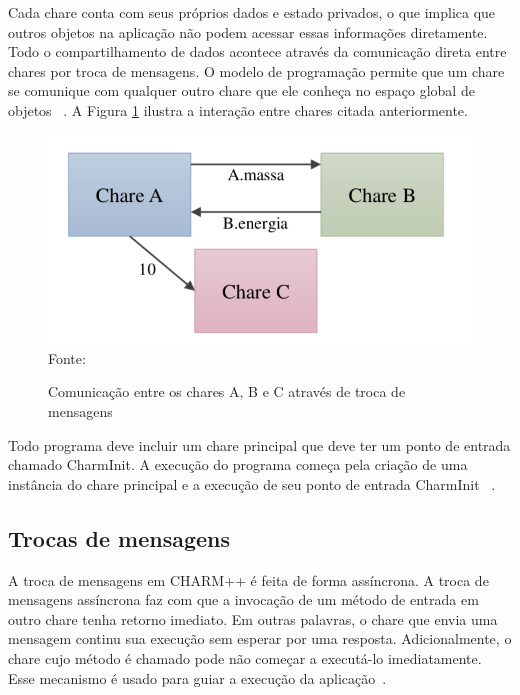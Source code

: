 Cada chare conta com seus próprios dados e estado privados, o que implica que outros objetos na aplicação não podem acessar essas informações diretamente. Todo o compartilhamento de dados acontece através da comunicação direta entre chares por troca de mensagens. O modelo de programação permite que um chare se comunique com qualquer outro chare que ele conheça no espaço global de objetos ~\cite[p.27]{pilla2015programaccao2}. A Figura \ref{img-chare} ilustra a interação entre chares citada anteriormente.

\begin{figure}[!htb]
	\centering
	\caption{Comunicação entre os chares A, B e C através de troca de mensagens}
	\centering
    \includegraphics[scale=0.30]{figuras/chares.png}
	\label{img-chare}
    \centering
	\\ Fonte: \cite[p.27]{pilla2015programaccao2}
\end{figure}

Todo programa deve incluir um chare principal que deve ter um ponto de entrada chamado CharmInit. A execução do programa começa pela criação de uma instância do chare principal e a execução de seu ponto de entrada CharmInit ~\cite[p.3]{kale1993parallel2}.

\subsection{Trocas de mensagens}
A troca de mensagens em CHARM++ é feita de forma assíncrona. A troca de mensagens assíncrona faz com que a invocação de um método de entrada em outro chare tenha retorno imediato. Em outras palavras, o chare que envia uma mensagem continu sua execução sem esperar por uma resposta. Adicionalmente, o chare cujo método é chamado pode não começar a executá-lo imediatamente. Esse mecanismo é usado para
guiar a execução da aplicação~\cite[p.28]{pilla2015programaccao2}.

